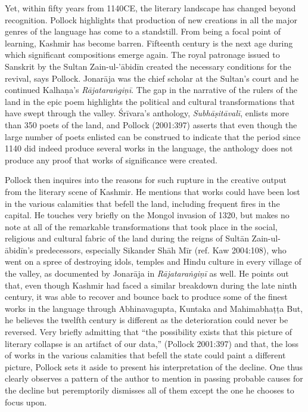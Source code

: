 Yet, within fifty years from 1140CE, the literary landscape has changed beyond recognition. Pollock highlights that production of new creations in all the major genres of the language has come to a standstill. From being a focal point of learning, Kashmir has become barren. Fifteenth century is the next age during which significant compositions emerge again. The royal patronage issued to Sanskrit by the Sultan Zain-ul-’ābidīn created the necessary conditions for the revival, says Pollock. Jonarāja was the chief scholar at the Sultan’s court and he continued Kalhaṇa’s {\sl Rājataraṅgiṇī}. The gap in the narrative of the rulers of the land in the epic poem highlights the political and cultural transformations that have swept through the valley. Śrīvara’s anthology, {\sl Subhāṣitāvalī}, enlists more than 350 poets of the land, and Pollock (2001:397) asserts that even though the large number of poets enlisted can be construed to indicate that the period since 1140 did indeed produce several works in the language, the anthology does not produce any proof that works of significance were created.

Pollock then inquires into the reasons for such rupture in the creative output from the literary scene of Kashmir. He mentions that works could have been lost in the various calamities that befell the land, including frequent fires in the capital. He touches very briefly on the Mongol invasion of 1320, but makes no note at all of the remarkable transformations that took place in the social, religious and cultural fabric of the land during the reigns of Sultān Zain-ul-ābidīn’s predecessors, especially Sikander Shāh Mīr (ref. Kaw 2004:108), who went on a spree of destroying idols, temples and Hindu culture in every village of the valley, as documented by Jonarāja in {\sl Rājataraṅgiṇī} as well. He points out that, even though Kashmir had faced a similar breakdown during the late ninth century, it was able to recover and bounce back to produce some of the finest works in the language through Abhinavagupta, Kuntaka and Mahimabhaṭṭa But, he believes the twelfth century is different as the deterioration could never be reversed. Very briefly admitting that “the possibility exists that this picture of literary collapse is an artifact of our data,” (Pollock 2001:397) and that, the loss of works in the various calamities that befell the state could paint a different picture, Pollock sets it aside to present his interpretation of the decline. One thus clearly observes a pattern of the author to mention in passing probable causes for the decline but peremptorily dismisses all of them except the one he chooses to focus upon.


